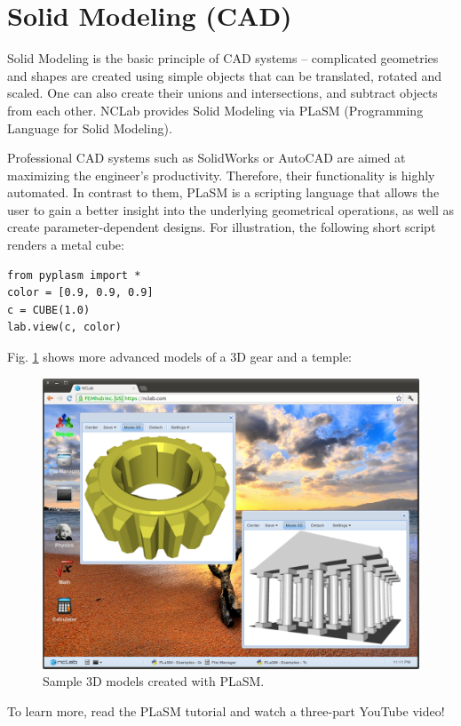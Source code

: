 \documentclass[article,A4,12pt]{llncs}
\begin{document}
\section{Solid Modeling (CAD)}

Solid Modeling is the basic principle of CAD systems -- complicated geometries 
and shapes are created using simple objects that can be translated, rotated and scaled. 
One can also create their unions and intersections, and subtract objects 
from each other. NCLab provides Solid Modeling via PLaSM (Programming Language for Solid 
Modeling). 

Professional CAD systems such as SolidWorks or AutoCAD are aimed at maximizing the engineer's
productivity. Therefore, their functionality is highly automated. In contrast to them, PLaSM 
is a scripting language that allows the user to gain a better insight into the underlying 
geometrical operations, as well as create parameter-dependent designs. 
For illustration, the following short script renders a metal cube:
\begin{verbatim}
from pyplasm import *
color = [0.9, 0.9, 0.9]
c = CUBE(1.0)
lab.view(c, color)
\end{verbatim}
Fig. \ref{fig:plasm1} shows more advanced models of a 3D gear and 
a temple:

\begin{figure}[!ht]
\begin{center}
\includegraphics[width=\textwidth]{img/plasm1.png}
\end{center}
\caption{Sample 3D models created with PLaSM.}
\label{fig:plasm1}
\end{figure}
\noindent
To learn more, read the PLaSM tutorial and watch a three-part YouTube video!
\newpage
\end{document}
